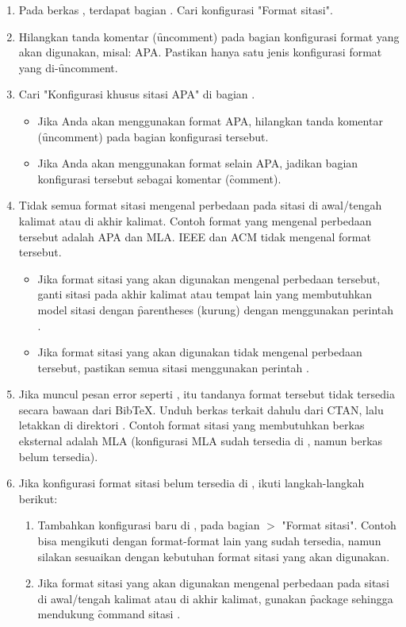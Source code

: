 \begin{enumerate}
	\item Pada berkas , terdapat bagian . Cari konfigurasi "Format sitasi".
	\item Hilangkan tanda komentar (\f{uncomment}) pada bagian konfigurasi format yang akan digunakan, misal: APA. Pastikan hanya satu jenis konfigurasi format yang di-\f{uncomment}.
	\item Cari "Konfigurasi khusus sitasi APA" di bagian .
	\begin{itemize}
		\item Jika Anda akan menggunakan format APA, hilangkan tanda komentar (\f{uncomment}) pada bagian konfigurasi tersebut.
		\item Jika Anda akan menggunakan format selain APA, jadikan bagian konfigurasi tersebut sebagai komentar (\f{comment}).
	\end{itemize}
	\item Tidak semua format sitasi mengenal perbedaan pada sitasi di awal/tengah kalimat atau di akhir kalimat.
	Contoh format yang mengenal perbedaan tersebut adalah APA dan MLA.
	IEEE dan ACM tidak mengenal format tersebut.
	\begin{itemize}
		\item Jika format sitasi yang akan digunakan mengenal perbedaan tersebut, ganti sitasi pada akhir kalimat atau tempat lain yang membutuhkan model sitasi dengan \f{parentheses} (kurung) dengan menggunakan perintah .
		\item Jika format sitasi yang akan digunakan tidak mengenal perbedaan tersebut, pastikan semua sitasi menggunakan perintah .
	\end{itemize}
	\item Jika muncul pesan error seperti , itu tandanya format tersebut tidak tersedia secara bawaan dari BibTeX.
	Unduh berkas terkait dahulu dari CTAN, lalu letakkan di direktori .
	Contoh format sitasi yang membutuhkan berkas eksternal adalah MLA (konfigurasi MLA sudah tersedia di , namun berkas  belum tersedia).
	\item Jika konfigurasi format sitasi belum tersedia di , ikuti langkah-langkah berikut:
	\begin{enumerate}
		\item Tambahkan konfigurasi baru di , pada bagian  $>$ "Format sitasi".
		Contoh bisa mengikuti dengan format-format lain yang sudah tersedia, namun silakan sesuaikan dengan kebutuhan format sitasi yang akan digunakan.
		\item Jika format sitasi yang akan digunakan mengenal perbedaan pada sitasi di awal/tengah kalimat atau di akhir kalimat, gunakan \f{package}  sehingga mendukung \f{command} sitasi .
	\end{enumerate}
\end{enumerate}


